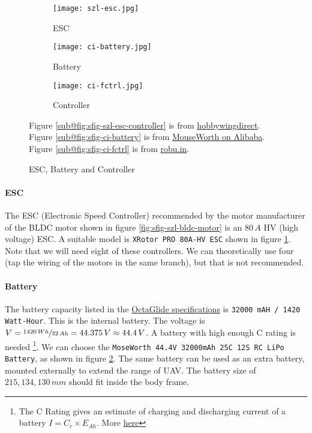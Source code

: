 \begin{figure}[ht]
    \centering
    \begin{subfigure}[b]{0.3\textwidth}
        \texttt{[image: szl-esc.jpg]}
        \caption{ESC}
        \label{fig:sfig-szl-esc-controller}
    \end{subfigure}
    \begin{subfigure}[b]{0.3\textwidth}
        \texttt{[image: ci-battery.jpg]}
        \caption{Battery}
        \label{fig:sfig-ci-battery}
    \end{subfigure}
    \begin{subfigure}[b]{0.3\textwidth}
        \texttt{[image: ci-fctrl.jpg]}
        \caption{Controller}
        \label{fig:sfig-ci-fctrl}
    \end{subfigure}
    \caption{ESC, Battery and Controller}
    \label{fig:ci-esc-battery-ctrl}
    \small
        Figure \ref{sub@fig:sfig-szl-esc-controller} is from \href{https://www.hobbywingdirect.com/products/xrotor-pro-80a-hv-esc-dual-pack}{hobbywingdirect}.
        Figure \ref{sub@fig:sfig-ci-battery} is from \href{https://www.alibaba.com/product-detail/High-Performance-44-4V-32000mAh-25C_1600101213026.html}{MouseWorth on Alibaba}.
        Figure \ref{sub@fig:sfig-ci-fctrl} is from \href{https://robu.in/product/holybro-original-pixhawk-px4-flight-controller-without-gps/}{robu.in}.
\end{figure}

\paragraph*{ESC}
The ESC (Electronic Speed Controller) recommended by the motor manufacturer of the BLDC motor shown in figure \ref{fig:sfig-szl-bldc-motor} is an $80\,A$ HV (high voltage) ESC. A suitable model is \texttt{XRotor PRO 80A-HV ESC} shown in figure \ref{fig:sfig-szl-esc-controller}. Note that we will need eight of these controllers. We can theoretically use four (tap the wiring of the motors in the same branch), but that is not recommended.

\paragraph*{Battery}
The battery capacity listed in the \href{https://www.dronestark.com/octaglide}{OctaGlide specifications} is \texttt{32000 mAH / 1420 Watt-Hour}. This is the internal battery. The voltage is $V = \sfrac{1420\,Wh}{32\,Ah}=44.375\,V \approx 44.4\,V$. A battery with high enough C rating is needed \footnote{The C Rating gives an estimate of charging and discharging current of a battery $I = C_{r} \times E_{Ah}$. More \href{https://www.power-sonic.com/blog/what-is-a-battery-c-rating/}{here}}. We can choose the \texttt{MoseWorth 44.4V 32000mAh 25C 12S RC LiPo Battery}, as shown in figure \ref{fig:sfig-ci-battery}. The same battery can be used as an extra battery, mounted externally to extend the range of UAV. The battery size of $215, 134, 130\,mm$ should fit inside the body frame.

